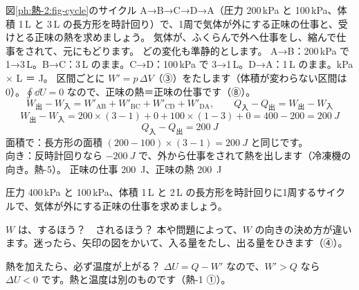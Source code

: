 \label{ph:熱-2:ex12}
\begin{phreidai}[長方形のサイクルの正味の仕事と熱]
図\ref{ph:熱-2:fig-cycle}のサイクル A→B→C→D→A（圧力 200\,kPa と 100\,kPa、体積 1\,L と 3\,L の長方形を時計回り）で、1周で気体が外にする正味の仕事と、受けとる正味の熱を求めましょう。
\phbamen
気体が、ふくらんで外へ仕事をし、縮んで仕事をされて、元にもどります。
\phmushi
どの変化も準静的とします。
\phzu
A→B：200\,kPa で 1→3\,L。B→C：3\,L のまま。C→D：100\,kPa で 3→1\,L。D→A：1\,L のまま。kPa × L ＝ J。
\phriyu
区間ごとに $W'=p\,\Delta V$（③）をたします（体積が変わらない区間は0）。$\oint\dd U=0$ なので、正味の熱＝正味の仕事です（⑧）。
\phtateru
\[W_{\text{出}}-W_{\text{入}}=W'_{\mathrm{AB}}+W'_{\mathrm{BC}}+W'_{\mathrm{CD}}+W'_{\mathrm{DA}},\qquad Q_{\text{入}}-Q_{\text{出}}=W_{\text{出}}-W_{\text{入}}\]
\phtoku
\[W_{\text{出}}-W_{\text{入}}=200\times(3-1)+0+100\times(1-3)+0=400-200=\qty{200}{J}\]
\[Q_{\text{入}}-Q_{\text{出}}=\qty{200}{J}\]
\phtashikame
面積で：長方形の面積 $(200-100)\times(3-1)=\qty{200}{J}$ と同じです。\\
向き：反時計回りなら $-\qty{200}{J}$ で、外から仕事をされて熱を出します（冷凍機の向き。熱-5）。
\kotae 正味の仕事 \qty{200}{J}、正味の熱 \qty{200}{J}
\end{phreidai}
\begin{jibun}
圧力 400\,kPa と 100\,kPa、体積 1\,L と 2\,L の長方形を時計回りに1周するサイクルで、気体が外にする正味の仕事を求めましょう。
\end{jibun}

\begin{tsumazuki}{$W$ は、するほう？　されるほう？}
本や問題によって、$W$ の向きの決め方が違います。迷ったら、矢印の図をかいて、入る量をたし、出る量をひきます（④）。
\end{tsumazuki}

\begin{tsumazuki}{熱を加えたら、必ず温度が上がる？}
$\Delta U=Q-W'$ なので、$W'>Q$ なら $\Delta U<0$ です。熱と温度は別のものです（熱-1 ①）。
\end{tsumazuki}

